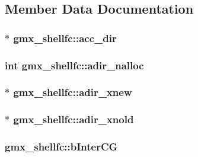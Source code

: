 \subsection{\-Member \-Data \-Documentation}
\hypertarget{structgmx__shellfc_ab42a7060e32fa3c3c778c62529287db5}{
\subsubsection[{acc\-\_\-dir}]{$\ast$ {\bf gmx\-\_\-shellfc\-::acc\-\_\-dir}}}\label{structgmx__shellfc_ab42a7060e32fa3c3c778c62529287db5}
\hypertarget{structgmx__shellfc_ac037d13eb9901f30be4051ba9a56468a}{
\subsubsection[{adir\-\_\-nalloc}]{\setlength{\rightskip}{0pt plus 5cm}int {\bf gmx\-\_\-shellfc\-::adir\-\_\-nalloc}}}\label{structgmx__shellfc_ac037d13eb9901f30be4051ba9a56468a}
\hypertarget{structgmx__shellfc_a527c013b5c77c3ba48a96f99cb1faf95}{
\subsubsection[{adir\-\_\-xnew}]{$\ast$ {\bf gmx\-\_\-shellfc\-::adir\-\_\-xnew}}}\label{structgmx__shellfc_a527c013b5c77c3ba48a96f99cb1faf95}
\hypertarget{structgmx__shellfc_a755decefd1deeefbf5847937163f5cc4}{
\subsubsection[{adir\-\_\-xnold}]{$\ast$ {\bf gmx\-\_\-shellfc\-::adir\-\_\-xnold}}}\label{structgmx__shellfc_a755decefd1deeefbf5847937163f5cc4}
\hypertarget{structgmx__shellfc_a9e1f632b569a5110de3ddd4af8802c1b}{
\subsubsection[{b\-Inter\-C\-G}]{ {\bf gmx\-\_\-shellfc\-::b\-Inter\-C\-G}}}\label{structgmx__shellfc_a9e1f632b569a5110de3ddd4af8802c1b}
